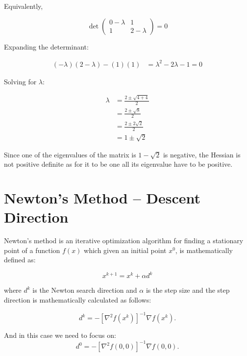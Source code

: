 \documentclass{article}
\begin{document}
Equivalently,

\begin{equation}
\det \begin{pmatrix} 0 - \lambda & 1 \\ 1 & 2 - \lambda \end{pmatrix} = 0
\end{equation}

Expanding the determinant:

\begin{align*}
(-\lambda)(2 - \lambda) - (1)(1) &= \lambda^2 - 2\lambda - 1 = 0
\end{align*}

Solving for \( \lambda \):

\begin{align*}
\lambda &= \frac{2 \pm \sqrt{4 + 4}}{2} \\
&= \frac{2 \pm \sqrt{8}}{2} \\
&= \frac{2 \pm 2\sqrt{2}}{2} \\
&= 1 \pm \sqrt{2}
\end{align*}

Since one of the eigenvalues of the matrix is \( 1 - \sqrt{2} \)   is negative, the Hessian is not positive definite as for it to be one all its eigenvalue have to be positive. 

\section{Newton's Method -- Descent Direction}

Newton’s method is an iterative optimization algorithm for finding a stationary point of a function \( f(x) \) which given an initial point \( x^0 \), is mathematically defined as:

\begin{equation}
x^{k+1} = x^k + \alpha d^k
\end{equation}

where \( d^k \) is the Newton search direction and $\alpha$ is the step size and the step direction is mathematically calculated as follows:

\begin{equation}
d^k = - [\nabla^2 f(x^k)]^{-1} \nabla f(x^k).
\end{equation}

And in this case we need to focus on:
\begin{equation}
d^0 = - [\nabla^2 f(0,0)]^{-1} \nabla f(0,0).
\end{equation}
\end{document}
